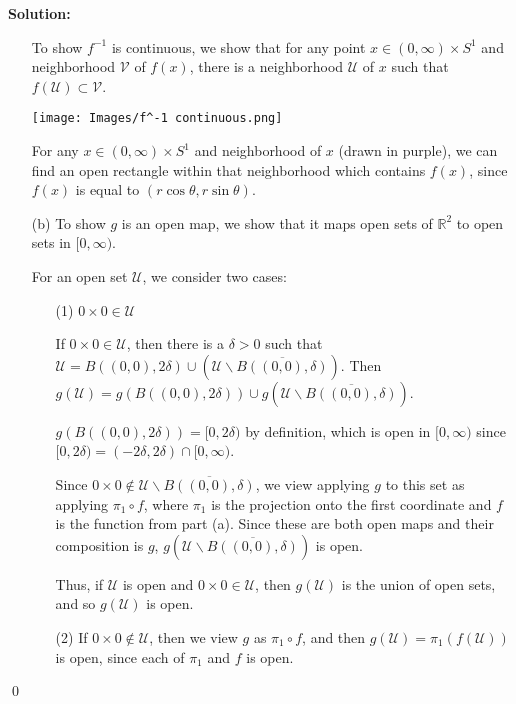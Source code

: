 \documentclass[11pt]{article}
\newenvironment{solution}{\textbf{Solution:}}{\qed\newpage}
\newcommand{\U}{\mathcal{U}}
\newcommand{\R}{\mathbb{R}}
\newcommand{\V}{\mathcal{V}}
\newcommand{\sk}{\smallskip}
\begin{document}
\begin{solution}
\begin{itemize}
        \sk

        To show $f^{-1}$ is continuous, we show that for any point $x \in (0, \infty) \times S^1$ and neighborhood $\V$ of $f(x)$, there is a neighborhood $\U$ of $x$ such that $f(\U) \subset \V$. 

        \begin{center}
            \texttt{[image: Images/f^-1 continuous.png]}
        \end{center}

        For any $x \in (0, \infty) \times S^1$ and neighborhood of $x$ (drawn in purple), we can find an open rectangle within that neighborhood which contains $f(x)$, since $f(x)$ is equal to $(r\cos\theta, r\sin\theta)$.

        \item[(b)] To show $g$ is an open map, we show that it maps open sets of $\R^2$ to open sets in $[0, \infty)$. 

        \sk

        For an open set $\U$, we consider two cases:

        \begin{itemize}
            \item[(1)] $0 \times 0 \in \U$

            If $0 \times 0 \in \U$, then there is a $\delta > 0$ such that $\U = B((0, 0), 2\delta) \cup (\U\backslash \overline{B((0, 0), \delta)})$. Then $g(\U) = g(B((0, 0), 2\delta)) \cup g(\U\backslash \overline{B((0, 0), \delta)})$. 

            \sk

            $g(B((0, 0), 2\delta)) = [0, 2\delta)$ by definition, which is open in $[0, \infty)$ since $[0, 2\delta) = (-2\delta, 2\delta) \cap [0, \infty)$.

            \sk
            
            Since $0 \times 0 \notin \U\backslash \overline{B((0, 0), \delta)}$, we view applying $g$ to this set as applying $\pi_1 \circ f$, where $\pi_1$ is the projection onto the first coordinate and $f$ is the function from part (a). Since these are both open maps and their composition is $g$, $g(\U\backslash \overline{B((0, 0), \delta)})$ is open. 

            \sk

            Thus, if $\U$ is open and $0 \times 0 \in \U$, then $g(\U)$ is the union of open sets, and so $g(\U)$ is open. 

            \item[(2)] If $0 \times 0 \notin \U$, then we view $g$ as $\pi_1 \circ f$, and then $g(\U) = \pi_1(f(\U))$ is open, since each of $\pi_1$ and $f$ is open.
            

\end{itemize}
\end{itemize}
\end{solution}
\end{document}
